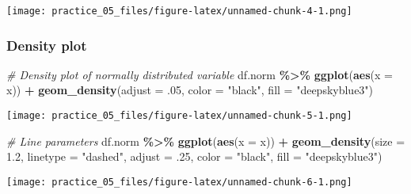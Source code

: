 \documentclass[
]{article}
\newenvironment{Shaded}{\begin{snugshade}}{\end{snugshade}}
\newcommand{\AttributeTok}[1]{\textcolor[rgb]{0.13,0.29,0.53}{#1}}
\newcommand{\CommentTok}[1]{\textcolor[rgb]{0.56,0.35,0.01}{\textit{#1}}}
\newcommand{\DecValTok}[1]{\textcolor[rgb]{0.00,0.00,0.81}{#1}}
\newcommand{\FloatTok}[1]{\textcolor[rgb]{0.00,0.00,0.81}{#1}}
\newcommand{\FunctionTok}[1]{\textcolor[rgb]{0.13,0.29,0.53}{\textbf{#1}}}
\newcommand{\NormalTok}[1]{#1}
\newcommand{\SpecialCharTok}[1]{\textcolor[rgb]{0.81,0.36,0.00}{\textbf{#1}}}
\newcommand{\StringTok}[1]{\textcolor[rgb]{0.31,0.60,0.02}{#1}}
\begin{document}
\texttt{[image: practice\_05\_files/figure-latex/unnamed-chunk-4-1.png]}

\subsubsection{Density plot}\label{density-plot}

\begin{Shaded}
\begin{Highlighting}[]
\CommentTok{\# Density plot of normally distributed variable}
\NormalTok{df.norm }\SpecialCharTok{\%\textgreater{}\%} 
  \FunctionTok{ggplot}\NormalTok{(}\FunctionTok{aes}\NormalTok{(}\AttributeTok{x =}\NormalTok{ x)) }\SpecialCharTok{+}
  \FunctionTok{geom\_density}\NormalTok{(}\AttributeTok{adjust =}\NormalTok{ .}\DecValTok{05}\NormalTok{,}
               \AttributeTok{color =} \StringTok{"black"}\NormalTok{,}
               \AttributeTok{fill =} \StringTok{"deepskyblue3"}\NormalTok{)}
\end{Highlighting}
\end{Shaded}

\texttt{[image: practice\_05\_files/figure-latex/unnamed-chunk-5-1.png]}

\begin{Shaded}
\begin{Highlighting}[]
\CommentTok{\# Line parameters}
\NormalTok{df.norm }\SpecialCharTok{\%\textgreater{}\%} 
  \FunctionTok{ggplot}\NormalTok{(}\FunctionTok{aes}\NormalTok{(}\AttributeTok{x =}\NormalTok{ x)) }\SpecialCharTok{+}
  \FunctionTok{geom\_density}\NormalTok{(}\AttributeTok{size =} \FloatTok{1.2}\NormalTok{, }
               \AttributeTok{linetype =} \StringTok{"dashed"}\NormalTok{, }
               \AttributeTok{adjust =}\NormalTok{ .}\DecValTok{25}\NormalTok{,}
               \AttributeTok{color =} \StringTok{"black"}\NormalTok{,}
               \AttributeTok{fill =} \StringTok{"deepskyblue3"}\NormalTok{)}
\end{Highlighting}
\end{Shaded}

\texttt{[image: practice\_05\_files/figure-latex/unnamed-chunk-6-1.png]}
\end{document}
